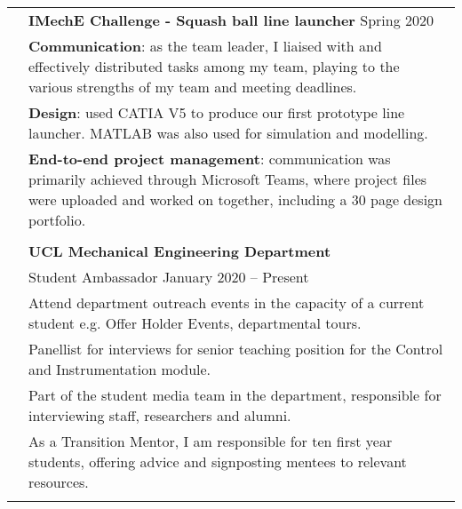 \documentclass[letterpaper, 11pt]{article}
\begin{document}
\begin{longtable}{p{1.3in}p{4.8in}}
{\color{OliveGreen}{Engineering projects}} 
& \textbf{IMechE Challenge - Squash ball line launcher} \hfill Spring 2020 \\
& \textbf{Communication}: as the team leader, I liaised with and effectively distributed tasks among my team, playing to the various strengths of my team and meeting deadlines. \\
& \textbf{Design}: used CATIA V5 to produce our first prototype line launcher. MATLAB was also used for simulation and modelling. \\
& \textbf{End-to-end project management}: communication was primarily achieved through Microsoft Teams, where project files were uploaded and worked on together, including a 30 page design portfolio. \\
& \\


{\color{OliveGreen}{Other experience}} 
& {\textbf{UCL Mechanical Engineering Department}}\\
& Student Ambassador \hfill January 2020 -- Present \\
& Attend department outreach events in the capacity of a current student e.g. Offer Holder Events, departmental tours.\\
& Panellist for interviews for senior teaching position for the Control and Instrumentation module.\\
& Part of the student media team in the department, responsible for interviewing staff, researchers and alumni.\\
& As a Transition Mentor, I am responsible for ten first year students, offering advice and signposting mentees to relevant resources.\\
& \\





\end{longtable}
\end{document}
